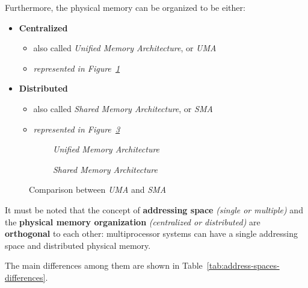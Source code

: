 \documentclass[english]{article}
\begin{document}
\begin{minipage}{\textwidth}
  \bigskip
  Furthermore, the physical memory can be organized to be either:
  \begin{itemize}
    \item \textbf{Centralized}
          \begin{itemize}
            \item also called \textit{Unified Memory Architecture}, or \textit{UMA}
            \item \textit{represented in Figure~\ref{subfig:uma}}
          \end{itemize}
    \item \textbf{Distributed}
          \begin{itemize}
            \item also called \textit{Shared Memory Architecture}, or \textit{SMA}
            \item \textit{represented in Figure~\ref{subfig:sma}}
          \end{itemize}
  \end{itemize}
  \bigskip
\end{minipage}

\begin{figure}[htbp]
  \bigskip
  \centering
  \begin{subfigure}[t]{0.495\textwidth}
    \centering
    \caption{\textit{Unified Memory Architecture}}
    \label{subfig:uma}
  \end{subfigure}
  \begin{subfigure}[t]{0.495\textwidth}
    \centering
    \caption{\textit{Shared Memory Architecture}}
    \label{subfig:sma}
  \end{subfigure}
  \caption{Comparison between \textit{UMA} and \textit{SMA}}
  \bigskip
\end{figure}

\bigskip
It must be noted that the concept of \textbf{addressing space} \textit{(single or multiple)} and the \textbf{physical memory organization} \textit{(centralized or distributed)} are \textbf{orthogonal} to each other:
multiprocessor systems can have a single addressing space and distributed physical memory.

The main differences among them are shown in Table~\ref{tab:address-spaces-differences}.
\end{document}
